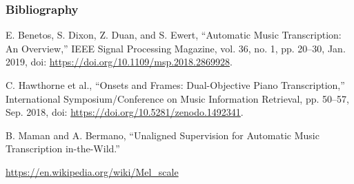 \documentclass{beamer}
\newcommand{\emp}[1]{\textcolor{tum}{\textbf{#1}}}
\begin{document}
\begin{frame}[shrink=5]
	\frametitle{Bibliography}



	
	\begin{thebibliography}{BenetosMusicTranscription}

		E. Benetos, S. Dixon, Z. Duan, and S. Ewert, “Automatic Music Transcription: An Overview,” IEEE Signal Processing Magazine, vol. 36, no. 1, pp. 20–30, Jan. 2019, doi: \url{https://doi.org/10.1109/msp.2018.2869928}.

		C. Hawthorne et al., “Onsets and Frames: Dual-Objective Piano Transcription,” International Symposium/Conference on Music Information Retrieval, pp. 50–57, Sep. 2018, doi: \url{https://doi.org/10.5281/zenodo.1492341}.

		B. Maman and A. Bermano, “Unaligned Supervision for Automatic Music Transcription in-the-Wild.”

		\url{https://en.wikipedia.org/wiki/Mel_scale}

	\end{thebibliography}
\end{frame}
\end{document}
